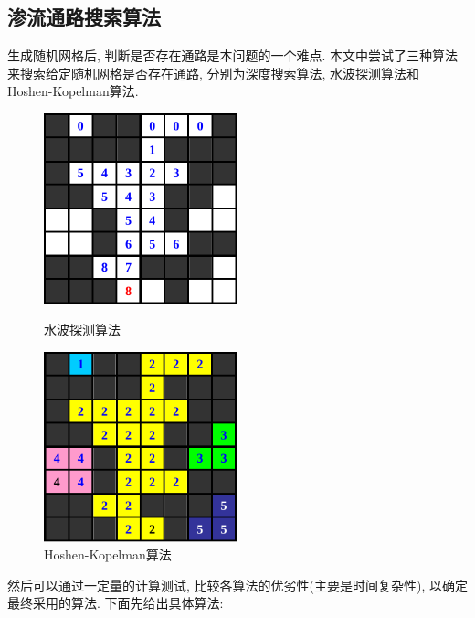 \documentclass[11pt,a4paper,boxed]{caspset}
\begin{document}
\subsection{渗流通路搜索算法}
生成随机网格后, 判断是否存在通路是本问题的一个难点. 本文中尝试了三种算法来搜索给定随机网格是否存在通路, 分别为深度搜索算法, 水波探测算法和 Hoshen-Kopelman算法.
\begin{figure}[!htb]
\begin{minipage}[b]{.5\textwidth}
\centering
\includegraphics[width=0.5\textwidth]{wave.pdf}
\caption{\label{wave}水波探测算法}
\end{minipage}
\begin{minipage}[b]{.5\textwidth}
\centering
\includegraphics[width=0.5\textwidth]{hk.pdf}
\caption{\label{hk}Hoshen-Kopelman算法}
\end{minipage}
\end{figure}
然后可以通过一定量的计算测试, 比较各算法的优劣性(主要是时间复杂性), 以确定最终采用的算法. 下面先给出具体算法:
\end{document}

